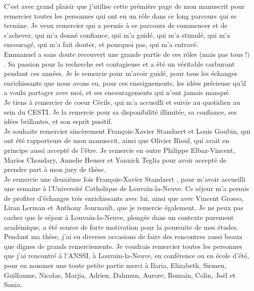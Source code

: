 C'est avec grand plaisir que j'utilise cette pr\'emi\`ere page de mon manuscrit pour remercier toutes les personnes qui ont eu un r\^{o}le dans ce long parcours qui se termine. Je veux remercier qui a permis \`a ce parcours de commencer et de s'achever, qui m'a donn\'e confiance, qui m'a guid\'e, qui m'a stimul\'e, qui m'a encourag\'e, qui m'a fait douter, et pourquoi pas, qui m'a entrav\'e. \\

Emmanuel a sans doute recouvert une grande partie de ces r\^{o}les (mais pas $\text{tous !)}$. Sa passion pour la recherche est contagieuse et a \'et\'e un v\'eritable carburant pendant ces ann\'ees. Je le remercie pour m'avoir guid\'e, pour tous les \'echanges enrichissants que nous avons eu, pour ces enseignements, les id\'ees pr\'ecieuse qu'il a voulu partager avec moi, et ses encouragements qui n'ont jamais manqu\'e. \\

Je tiens \`a remercier de coeur C\'ecile, qui m'a accueilli et suivie au quotidien au sein du CESTI. Je la remercie pour sa disponibilit\'e illimit\'ee, sa confiance, ses id\'ees brillantes, et son esprit positif. \\

Je souhaite remercier sinc\`{e}rement Fran\c{c}ois-Xavier Standaert et Louis Goubin, qui ont \'et\'e rapporteurs de mon manuscrit, ainsi que Olivier Rioul, qui avait en principe aussi accept\'e de l'\^{e}tre. Je remercie en outre Philippe Elbaz-Vincent, Marios Choudary,  Annelie Heuser et Yannick Teglia  pour avoir accept\'e de prendre part \`a mon jury de th\`{e}se. \\

Je remercie une deuxi\`{e}me fois Fran\c{c}ois-Xavier Standaert , pour m'avoir accueilli une semaine \`a l'Universit\'e Catholique de Louvain-la-Neuve. Ce s\'ejour m'a permis de profiter d'\'echanges tr\`{e}s enrichissants avec lui, ainsi que avec Vincent Grosso, Liran Lerman et Anthony Journault, que je remercie \'egalement. Je ne peux pas cacher que le s\'ejour \`a Louvain-la-Neuve, plong\'ee dans un contexte purement acad\'emique, a \'et\'e source de forte motivation pour la poursuite de mes \'etudes. \\

Pendant ma th\`{e}se, j'ai eu diverses occasions de faire des rencontres aussi beaux que dignes de grands remerciements. Je voudrais remercier toutes les personnes que j'ai rencontr\'e \`a l'ANSSI, \`a Louvain-la-Neuve, en conf\'erence ou en \'ecole d'\'et\'e, pour en nommer une toute petite partie merci \`a Ilaria, Elizabeth, Siemen, Guillaume, Nicolas, Marjia, Adrien, Dahmun, Aurore, Romain, Colin, Jo\"el et Sonia.\\

